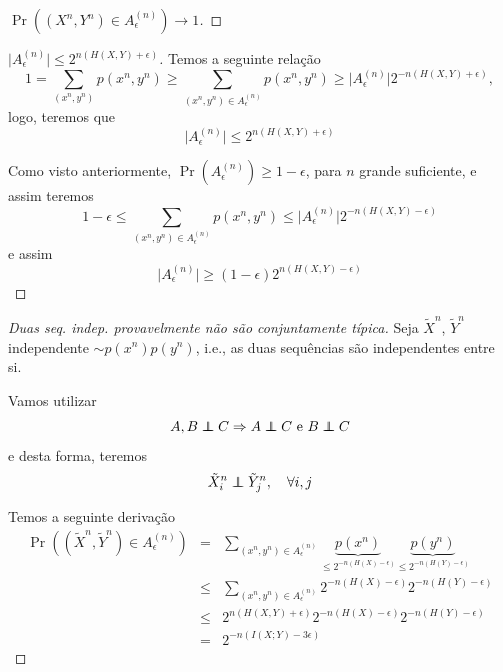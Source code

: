 \begin{frame}[allowframebreaks]
\begin{proof}[$\Pr \left( (X^n,Y^n) \in A_{\epsilon}^{(n)} \right) \rightarrow 1$]
  \end{proof}

  \framebreak

  \begin{proof}[$\vert A_{\epsilon}^{(n)} \vert \leq 2^{n(H(X,Y)+\epsilon)}$]
  Temos a seguinte relação
  \begin{equation}
  1 = \sum_{(x^n , y^n)} p(x^n, y^n) \geq \sum_{(x^n , y^n) \in A_{\epsilon}^{(n)}} p(x^n, y^n) \geq \vert A_{\epsilon}^{(n)} \vert 2^{-n(H(X,Y)+\epsilon)}  ,
  \end{equation} 
  logo, teremos que
  \begin{equation}
  \vert A_{\epsilon}^{(n)} \vert \leq 2^{n(H(X,Y)+\epsilon)}
  \end{equation}

  \proofbreak

  Como visto anteriormente, $\Pr(A_{\epsilon}^{(n)}) \geq 1 - \epsilon$, para $n$ grande suficiente, e assim teremos
  \begin{equation}
  1 - \epsilon \leq \sum_{(x^n , y^n) \in A_{\epsilon}^{(n)}} p(x^n, y^n) \leq \vert A_{\epsilon}^{(n)} \vert 2^{-n(H(X,Y)-\epsilon)} 
  \end{equation}
  e assim
  \begin{equation}
  \vert A_{\epsilon}^{(n)} \vert \geq (1 - \epsilon) 2^{n(H(X,Y)-\epsilon)}
  \end{equation}

  \end{proof}


  \framebreak

  \begin{proof}[Duas seq. indep. provavelmente não são conjuntamente típica]
  Seja $\tilde{X}^n$, $\tilde{Y}^n$ independente $\sim p(x^n)p(y^n)$, i.e., as duas sequências 
  são independentes entre si.

  Vamos utilizar
  \begin{equation}
  A, B \independent C  \Rightarrow A \independent C \text{ e } B \independent C
  \end{equation}
  e desta forma, teremos
  \begin{equation}
  \tilde{X}_i^n \independent \tilde{Y}_j^n , \quad \forall i,j
  \end{equation}

  \proofbreak

  Temos a seguinte derivação
  \begin{eqnarray}
  \Pr \left( (\tilde{X}^n, \tilde{Y}^n) \in A_{\epsilon}^{(n)} \right) &=& \sum_{(x^n,y^n) \in A_{\epsilon}^{(n)}} \underbrace{p(x^n)}_{\leq 2^{-n(H(X)-\epsilon)}} \underbrace{p(y^n)}_{\leq 2^{-n(H(Y)-\epsilon)}} \nonumber \\
		&\leq& \sum_{(x^n,y^n) \in A_{\epsilon}^{(n)}} 2^{-n(H(X)-\epsilon)} 2^{-n(H(Y)-\epsilon)} \nonumber \\
		&\leq& 2^{n(H(X,Y)+\epsilon)} 2^{-n(H(X)-\epsilon)} 2^{-n(H(Y)-\epsilon)} \nonumber \\
		&=& 2^{-n(I(X;Y)-3\epsilon)}
  \end{eqnarray}


\end{proof}
\end{frame}
